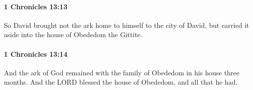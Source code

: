 		\paragraph{1 Chronicles 13:13} %
			\label{1CHRONICLES-13-13}

			So David brought not the ark home to himself to the city of David, but carried it aside into the house of Obededom the Gittite.


		\paragraph{1 Chronicles 13:14} %
			\label{1CHRONICLES-13-14}

			And the ark of God remained with the family of Obededom in his house three months. And the LORD blessed the house of Obededom, and all that he had.

